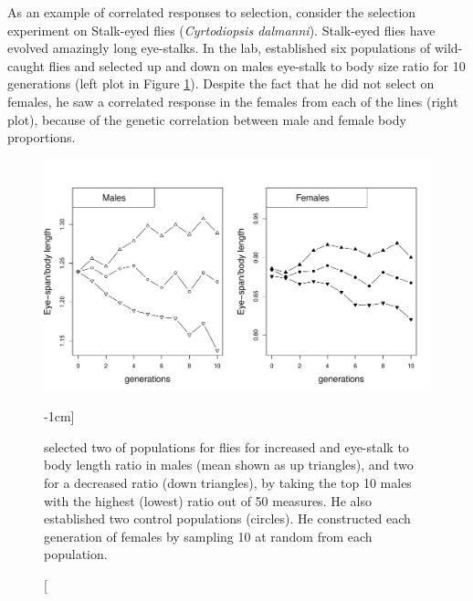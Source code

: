 As an example of correlated responses to selection, consider the  \citeauthor{wilkinson:93} selection experiment on Stalk-eyed
 flies ({\it Cyrtodiopsis  dalmanni}). Stalk-eyed flies have evolved amazingly long eye-stalks. In the lab, \citeauthor{wilkinson:93} established six populations of
 wild-caught flies and selected up and down on males eye-stalk to body
 size ratio for 10 generations (left plot in Figure
 \ref{fig:Stalk_eyed_response}). Despite the fact that he did not
 select on females, he saw a correlated response in the females from
 each of the lines (right plot), because of the genetic correlation
 between male and female body proportions. 

\begin{figure}
\begin{center}
\includegraphics[width= \textwidth]{Journal_figs/Quant_gen/stalk_eyed_flies/stalk_eyed_flies_response.pdf}
\end{center}
\caption[][-1cm]{ \citeauthor{wilkinson:93} selected two of populations for flies for
 increased and eye-stalk to body length ratio in males (mean shown as
 up triangles), and two for a
 decreased ratio (down triangles), by taking the top 10 males with the highest (lowest)
 ratio out of 50 measures. He also established two control populations
 (circles). He constructed each generation of females by sampling 10
 at random from each population.  

} \label{fig:Stalk_eyed_response}   %
\end{figure}

